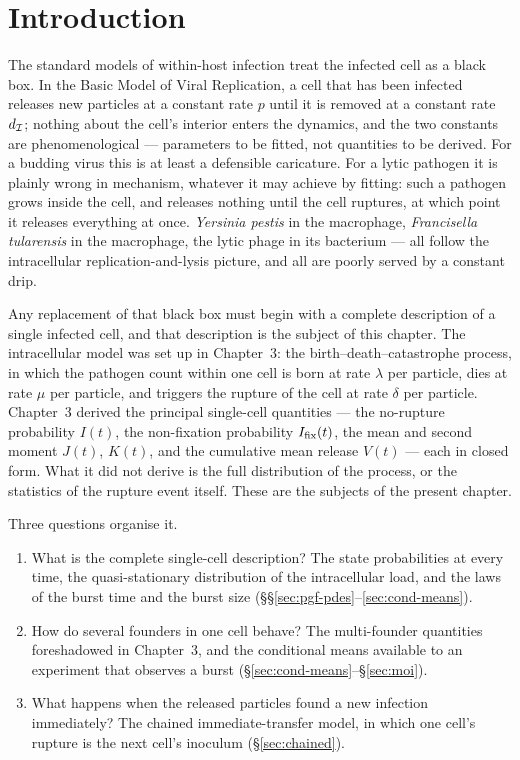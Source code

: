 
\section{Introduction}

The standard models of within-host infection treat the infected cell as a
black box. In the Basic Model of Viral Replication, a cell that has been
infected releases new particles at a constant rate $p$ until it is removed
at a constant rate $d_{\mathcal{I}}$; nothing about the cell's interior enters
the dynamics, and the two constants are phenomenological --- parameters to
be fitted, not quantities to be derived. For a budding virus this is at
least a defensible caricature. For a lytic pathogen it is plainly wrong in
mechanism, whatever it may achieve by fitting: such a pathogen grows inside
the cell, and releases nothing until the cell ruptures, at which point it
releases everything at once. \textit{Yersinia pestis} in the macrophage,
\textit{Francisella tularensis} in the macrophage, the lytic phage in its
bacterium --- all follow the intracellular replication-and-lysis picture,
and all are poorly served by a constant drip.

Any replacement of that black box must begin with a complete description of
a single infected cell, and that description is the subject of this
chapter. The intracellular model was set up in Chapter~3: the
birth--death--catastrophe process, in which the pathogen count within one
cell is born at rate $\lambda$ per particle, dies at rate $\mu$ per
particle, and triggers the rupture of the cell at rate $\delta$ per
particle. Chapter~3 derived the principal single-cell quantities --- the
no-rupture probability $I(t)$, the non-fixation probability $I_{\mathrm{fix}}(t)$,
the mean and second moment $J(t)$, $K(t)$, and the cumulative mean release
$V(t)$ --- each in closed form. What it did not derive is the full
distribution of the process, or the statistics of the rupture event itself.
These are the subjects of the present chapter.

Three questions organise it.
\begin{enumerate}
\item What is the complete single-cell description? The state
probabilities at every time, the quasi-stationary distribution of the
intracellular load, and the laws of the burst time and the burst size
(\S\S\ref{sec:pgf-pdes}--\ref{sec:cond-means}).
\item How do several founders in one cell behave? The multi-founder
quantities foreshadowed in Chapter~3, and the conditional means available
to an experiment that observes a burst
(\S\ref{sec:cond-means}--\S\ref{sec:moi}).
\item What happens when the released particles found a new infection
immediately? The chained immediate-transfer model, in which one cell's
rupture is the next cell's inoculum (\S\ref{sec:chained}).
\end{enumerate}

